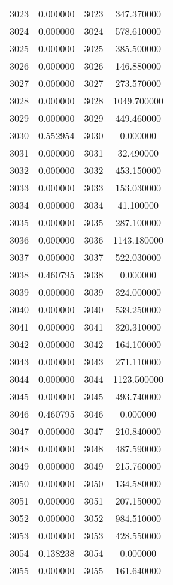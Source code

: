 \documentclass[12pt]{article}
\begin{document}
\begin{longtable}{@{}cccc@{}}
3023 & 0.000000 & 3023 & 347.370000 \\
3024 & 0.000000 & 3024 & 578.610000 \\
3025 & 0.000000 & 3025 & 385.500000 \\
3026 & 0.000000 & 3026 & 146.880000 \\
3027 & 0.000000 & 3027 & 273.570000 \\
3028 & 0.000000 & 3028 & 1049.700000 \\
3029 & 0.000000 & 3029 & 449.460000 \\
3030 & 0.552954 & 3030 & 0.000000 \\
3031 & 0.000000 & 3031 & 32.490000 \\
3032 & 0.000000 & 3032 & 453.150000 \\
3033 & 0.000000 & 3033 & 153.030000 \\
3034 & 0.000000 & 3034 & 41.100000 \\
3035 & 0.000000 & 3035 & 287.100000 \\
3036 & 0.000000 & 3036 & 1143.180000 \\
3037 & 0.000000 & 3037 & 522.030000 \\
3038 & 0.460795 & 3038 & 0.000000 \\
3039 & 0.000000 & 3039 & 324.000000 \\
3040 & 0.000000 & 3040 & 539.250000 \\
3041 & 0.000000 & 3041 & 320.310000 \\
3042 & 0.000000 & 3042 & 164.100000 \\
3043 & 0.000000 & 3043 & 271.110000 \\
3044 & 0.000000 & 3044 & 1123.500000 \\
3045 & 0.000000 & 3045 & 493.740000 \\
3046 & 0.460795 & 3046 & 0.000000 \\
3047 & 0.000000 & 3047 & 210.840000 \\
3048 & 0.000000 & 3048 & 487.590000 \\
3049 & 0.000000 & 3049 & 215.760000 \\
3050 & 0.000000 & 3050 & 134.580000 \\
3051 & 0.000000 & 3051 & 207.150000 \\
3052 & 0.000000 & 3052 & 984.510000 \\
3053 & 0.000000 & 3053 & 428.550000 \\
3054 & 0.138238 & 3054 & 0.000000 \\
3055 & 0.000000 & 3055 & 161.640000 \\

\end{longtable}
\end{document}
